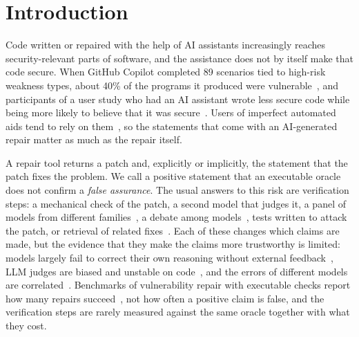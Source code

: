 \documentclass[ai,article,submit,oneauthor]{Definitions/mdpi}
\begin{document}
\section{Introduction}

Code written or repaired with the help of AI assistants increasingly reaches security-relevant parts of software, and the assistance does not by itself make that code secure. When GitHub Copilot completed 89 scenarios tied to high-risk weakness types, about 40\% of the programs it produced were vulnerable~\cite{Pearce2022AsleepAtThe}, and participants of a user study who had an AI assistant wrote less secure code while being more likely to believe that it was secure~\cite{Perry2023DoUsersWrite}. Users of imperfect automated aids tend to rely on them~\cite{Parasuraman2010ComplacencyAndBias}, so the statements that come with an AI-generated repair matter as much as the repair itself.

A repair tool returns a patch and, explicitly or implicitly, the statement that the patch fixes the problem. We call a positive statement that an executable oracle does not confirm a \emph{false assurance}. The usual answers to this risk are verification steps: a mechanical check of the patch, a second model that judges it, a panel of models from different families~\cite{Verga2024ReplacingJudgesWith}, a debate among models~\cite{Du2024ImprovingFactualityAnd}, tests written to attack the patch, or retrieval of related fixes~\cite{Lewis2020RetrievalAugmentedGeneration}. Each of these changes which claims are made, but the evidence that they make the claims more trustworthy is limited: models largely fail to correct their own reasoning without external feedback~\cite{Huang2024LargeLanguageModels}, LLM judges are biased and unstable on code~\cite{Zheng2023JudgingLlmAs,Jiang2026CodejudgebenchBenchmarkingLlm}, and the errors of different models are correlated~\cite{Kim2025CorrelatedErrorsIn}. Benchmarks of vulnerability repair with executable checks report how many repairs succeed~\cite{Bui2022Vul4jDatasetOf,Wei2025PatchevalNewBenchmark,Bui2026Vul4pyBenchmarkingAutomated}, not how often a positive claim is false, and the verification steps are rarely measured against the same oracle together with what they cost.
\end{document}
